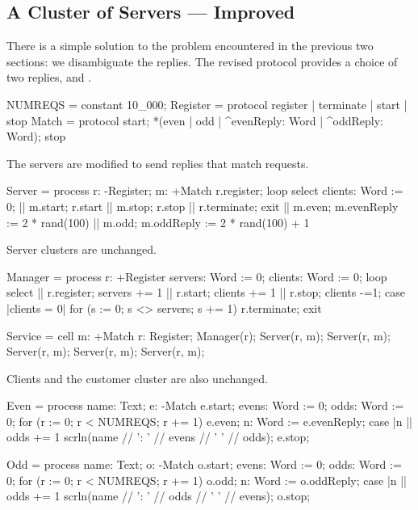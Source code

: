\subsection{A Cluster of Servers --- Improved}

There is a simple solution to the problem encountered in the previous two sections: we disambiguate the replies.  The revised protocol  provides a choice of two replies,  and .
\begin{code}
NUMREQS = constant 10_000;
Register = protocol { register | terminate | start | stop }
Match = protocol 
{ 
  start; 
  *(even | odd | ^evenReply: Word | ^oddReply: Word); 
  stop 
}
\end{code}

The servers are modified to send replies that match requests.
\begin{code}
Server = process r: -Register; m: +Match 
{
  r.register;
  loop select 
    clients: Word := 0;
  {
    || m.start; r.start
    || m.stop; r.stop
    || r.terminate; exit
    || m.even; m.evenReply := 2 * rand(100)
    || m.odd; m.oddReply := 2 * rand(100) + 1
  }
}
\end{code}

Server clusters are unchanged.
\begin{code}
Manager = process r: +Register
{
  servers: Word := 0;
  clients: Word := 0;
  loop select
  {
    || r.register; servers += 1
    || r.start; clients += 1
    || r.stop; clients -=1;
       case
       {
         |clients = 0|
            for (s := 0; s <> servers; s += 1)
              r.terminate;
            exit
       }
  }
}
\end{code}

\begin{code}
Service = cell m: +Match
{
  r: Register;
  Manager(r);
  Server(r, m);
  Server(r, m);
  Server(r, m);
  Server(r, m);
  Server(r, m);
}
\end{code}

Clients and the customer cluster are also unchanged.
\begin{code}
Even = process name: Text; e: -Match
{
  e.start;
  evens: Word := 0;
  odds: Word := 0;
  for (r := 0; r < NUMREQS; r += 1)
  {
    e.even;
    n: Word := e.evenReply;
    case
    {
      |n %
      || odds += 1
    }
  }
  scrln(name // ': ' // evens // '  ' // odds);
  e.stop;
}
\end{code}

\begin{code}
Odd = process name: Text; o: -Match
{
  o.start;
  evens: Word := 0;
  odds: Word := 0;
  for (r := 0; r < NUMREQS; r += 1)
  {
    o.odd;
    n: Word := o.oddReply;
    case
    {
      |n %
      || odds += 1
    }
  }
  scrln(name // ': ' // odds // '  ' // evens);
  o.stop;
}
\end{code}

